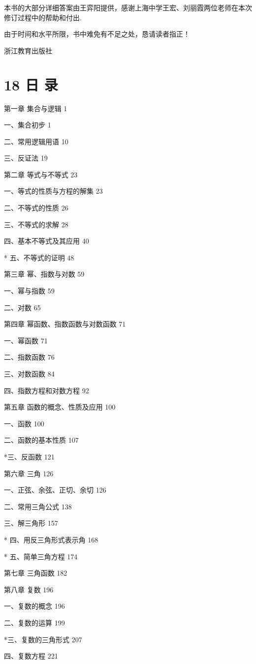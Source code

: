 \documentclass[10pt]{article}
\begin{document}
本书的大部分详细答案由王弈阳提供，感谢上海中学王宏、刘丽霞两位老师在本次修订过程中的帮助和付出.

由于时间和水平所限，书中难免有不足之处，恳请读者指正！

浙江教育出版社

\section*{18 日 录}

第一章 集合与逻辑 1

一、集合初步 1

二、常用逻辑用语 10

三、反证法 19

第二章 等式与不等式 23

一、等式的性质与方程的解集 23

二、不等式的性质 26

三、不等式的求解 28

四、基本不等式及其应用 40

* 五、不等式的证明 48

第三章 幂、指数与对数 59

一、幂与指数 59

二、对数 65

第四章 幂函数、指数函数与对数函数 71

一、幂函数 71

二、指数函数 76

三、对数函数 84

四、指数方程和对数方程 92

第五章 函数的概念、性质及应用 100

一、函数 100

二、函数的基本性质 107

*三、反函数 121

第六章 三角 126

一、正弦、余弦、正切、余切 126

二、常用三角公式 138

三、解三角形 157

* 四、用反三角形式表示角 168

* 五、简单三角方程 174

第七章 三角函数 182

第八章 复数 196

一、复数的概念 196

二、复数的运算 199

*三、复数的三角形式 207

四、复数方程 221
\end{document}
